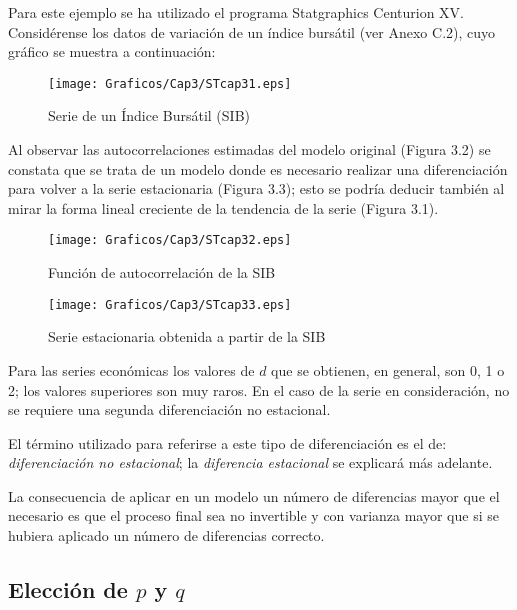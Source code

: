 \begin{ejemplo}
Para este ejemplo se ha utilizado el programa Statgraphics Centurion XV. Consid\'{e}rense los datos de variaci\'{o}n de un \'{i}ndice burs\'{a}til (ver Anexo C.2), cuyo gr\'{a}fico se muestra a continuaci\'{o}n:

\begin{figure}[H]
\centering
\texttt{[image: Graficos/Cap3/STcap31.eps]}
\caption{Serie de un \'{I}ndice Burs\'{a}til (SIB)}
\end{figure}

Al observar las autocorrelaciones estimadas del modelo original (Figura 3.2) se constata que se trata de un modelo donde es necesario realizar una diferenciaci\'{o}n para volver a la serie estacionaria (Figura 3.3); esto se podr\'{i}a deducir tambi\'{e}n al mirar la forma lineal creciente de la tendencia de la serie (Figura 3.1).

\begin{figure}[H]
\centering
\texttt{[image: Graficos/Cap3/STcap32.eps]}
\caption{Funci\'{o}n de autocorrelaci\'{o}n de la SIB}
\end{figure}

\begin{figure}[H]
\centering
\texttt{[image: Graficos/Cap3/STcap33.eps]}
\caption{Serie estacionaria obtenida a partir de la SIB}
\end{figure}

Para las series econ\'{o}micas los valores de $d$ que se obtienen, en general, son 0, 1 o 2; los valores superiores son muy raros. En el caso de la serie en consideraci\'{o}n, no se requiere una segunda diferenciaci\'{o}n no estacional.
\end{ejemplo}

\begin{observacion}
 El t\'{e}rmino utilizado para referirse a este tipo de diferenciaci\'{o}n es el de: \emph{diferenciaci\'{o}n no estacional}; la \emph{diferencia estacional} se explicar\'{a} m\'{a}s adelante.
\end{observacion}

La consecuencia de aplicar en un modelo un n\'{u}mero de diferencias mayor que el necesario es que el proceso final sea no invertible y con varianza mayor que si se hubiera aplicado un n\'{u}mero de diferencias correcto.

\subsection{Elecci\'{o}n de $p$ y $q$}

